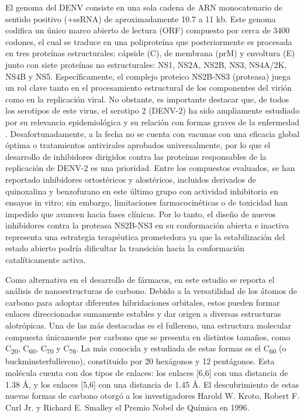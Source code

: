 El genoma del DENV consiste en una sola cadena de ARN monocatenario de sentido positivo (+ssRNA) de aproximadamente 10.7 a 11 kb. Este genoma codifica un único marco abierto de lectura (ORF) compuesto por cerca de 3400 codones, el cual se traduce en una poliproteína que posteriormente es procesada en tres proteínas estructurales: cápside (C), de membrana (prM) y envoltura (E) junto con siete proteínas no estructurales: NS1, NS2A, NS2B, NS3, NS4A/2K, NS4B y NS5. Específicamente, el complejo proteico NS2B-NS3 (proteasa) juega un rol clave tanto en el procesamiento estructural de los componentes del virión como en la replicación viral. No obstante, es importante destacar que, de todos los serotipos de este virus, el serotipo 2 (DENV-2) ha sido ampliamente estudiado por su relevancia epidemiológica y su relación con formas graves de la enfermedad \cite{contreras2021aspectos}. Desafortunadamente, a la fecha no se cuenta con vacunas con una eficacia global óptima o tratamientos antivirales aprobados universalmente, por lo que el desarrollo de inhibidores dirigidos contra las proteínas responsables de la replicación de DENV-2 es una prioridad. Entre los compuestos evaluados, se han reportado inhibidores ortostéricos y alostéricos, incluidos derivados de quinoxalina y benzofurano en este último grupo con actividad inhibitoria en ensayos in vitro; sin embargo, limitaciones farmacocinéticas o de toxicidad han impedido que avancen hacia fases clínicas. Por lo tanto, el diseño de nuevos inhibidores contra la proteasa NS2B-NS3 en su conformación abierta e inactiva representa una estrategia terapéutica prometedora ya que la estabilización del estado abierto podría dificultar la transición hacia la conformación catalíticamente activa.

Como alternativa en el desarrollo de fármacos, en este estudio se reporta el análisis de nanoestructuras de carbono. Debido a la versatilidad de los átomos de carbono para adoptar diferentes hibridaciones orbitales, estos pueden formar enlaces direccionados sumamente estables y dar origen a diversas estructuras alotrópicas. Una de las más destacadas es el fullereno, una estructura molecular compuesta únicamente por carbono que se presenta en distintos tamaños, como C\textsubscript{20}, C\textsubscript{60}, C\textsubscript{70} y C\textsubscript{76}. La más conocida y estudiada de estas formas es el C\textsubscript{60} (o buckminsterfullereno), constituido por 20 hexágonos y 12 pentágonos. Esta molécula cuenta con dos tipos de enlaces: los enlaces [6,6] con una distancia de 1.38 Å, y los enlaces [5,6] con una distancia de 1.45 Å. \cite{martinez2024emergence} El descubrimiento de estas nuevas formas de carbono otorgó a los investigadores Harold W. Kroto, Robert F. Curl Jr. y Richard E. Smalley el Premio Nobel de Química en 1996.

